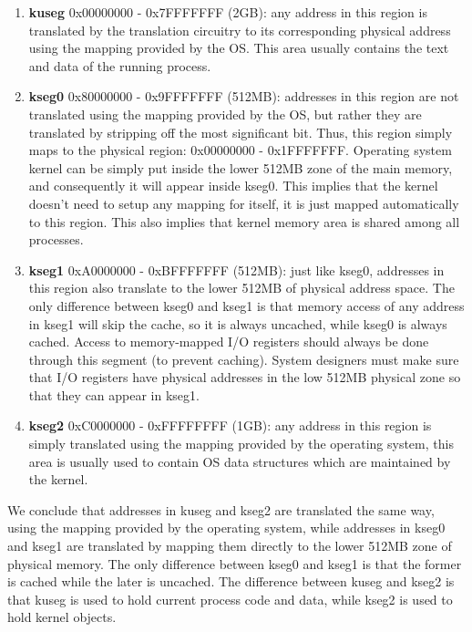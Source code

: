 \documentclass[oneside]{book}
\begin{document}
\begin{enumerate}

\item \textbf{kuseg} 0x00000000 - 0x7FFFFFFF (2GB):
      any address in this region is translated by the translation
      circuitry to its corresponding physical address using the
      mapping provided by the OS. This area usually contains the
      text and data of the running process.

\item \textbf{kseg0} 0x80000000 - 0x9FFFFFFF (512MB):
      addresses in this region are not translated using the
      mapping provided by the OS, but rather they are translated
      by stripping off the most significant bit. Thus, this
      region simply maps to the physical region:
      0x00000000 - 0x1FFFFFFF. Operating system kernel can
      be simply put inside the lower 512MB zone of the
      main memory, and consequently it will appear inside kseg0.
      This implies that the kernel doesn't need to setup
      any mapping for itself, it is just mapped automatically
      to this region. This also implies that kernel memory
      area is shared among all processes.

\item \textbf{kseg1} 0xA0000000 - 0xBFFFFFFF (512MB):
      just like kseg0, addresses in this region also translate
      to the lower 512MB of physical address space. The only
      difference between kseg0 and kseg1 is that memory access
      of any address in kseg1 will skip the cache, so it is
      always uncached, while kseg0 is always cached. Access
      to memory-mapped I/O registers should always be done
      through this segment (to prevent caching). System
      designers must make sure that I/O registers have
      physical addresses in the low 512MB physical zone so that
      they can appear in kseg1.

\item \textbf{kseg2} 0xC0000000 - 0xFFFFFFFF (1GB):
      any address in this region is simply translated
      using the mapping provided by the operating system,
      this area is usually used to contain OS data structures
      which are maintained by the kernel.

\end{enumerate}

We conclude that addresses in kuseg and kseg2 are translated
the same way, using the mapping provided by the operating system,
while addresses in kseg0 and kseg1 are translated by mapping them
directly to the lower 512MB zone of physical memory. The only
difference between kseg0 and kseg1 is that the former is cached
while the later is uncached. The difference between kuseg and kseg2
is that kuseg is used to hold current process code and data,
while kseg2 is used to hold kernel objects.\\
\end{document}
